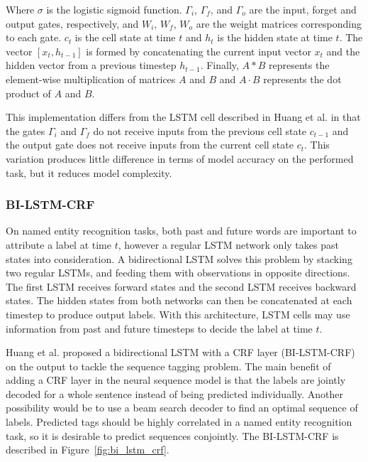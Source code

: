 \documentclass{nle}
\begin{document}
Where $ \sigma $ is the logistic sigmoid function. $ \Gamma_i $, $ \Gamma_f $, and $ \Gamma_o $ are the input,
forget and output gates, respectively, and $ W_i $, $ W_f $, $ W_o $ are the weight 
matrices corresponding to each gate. $ c_{t} $ is the cell 
state at time $ t $ and $ h_{t} $ is the hidden state at time $ t $. 
The vector $ [x_{t},h_{t-1}] $ is formed by concatenating the current input vector 
$ x_{t} $ and the hidden vector from a previous timestep $ h_{t-1} $. Finally,
$ A \ast B $ represents the element-wise multiplication of matrices $ A $ and $ B $
and $ A \cdot B $ represents the dot product of $ A $ and $ B $.

This implementation differs from the LSTM cell described in Huang et al. 
in that the gates $ \Gamma_i $ and $ \Gamma_f $ do not receive inputs from the previous 
cell state $ c_{t-1} $ and the output gate does not receive inputs from the current cell 
state $ c_{t} $. This variation produces little difference in terms of model accuracy on
the performed task, but it reduces model complexity.

\subsubsection{BI-LSTM-CRF}
\label{sssec:lstm_crf}

On named entity recognition tasks, both past and future words are important 
to attribute a label at time $ t $, however a regular LSTM network only takes 
past states into consideration. A bidirectional LSTM solves this problem by stacking 
two regular LSTMs, and feeding them with observations in opposite directions. The first LSTM 
receives forward states and the second LSTM receives backward states. The hidden states from both 
networks can then be concatenated at each timestep to produce output labels. With this 
architecture, LSTM cells may use information from past and future timesteps to decide 
the label at time $ t $.

Huang et al.  proposed a bidirectional LSTM with a CRF layer (BI-LSTM-CRF) on 
the output to tackle the sequence tagging problem. The main benefit of adding a CRF layer 
in the neural sequence model is that the labels are jointly decoded for a whole sentence 
instead of being predicted individually. Another possibility would be to use a beam search
decoder to find an optimal sequence of labels. Predicted tags should be highly correlated 
in a named entity recognition task, so it is desirable to predict sequences conjointly.
The BI-LSTM-CRF is described in Figure~\ref{fig:bi_lstm_crf}.
\end{document}
